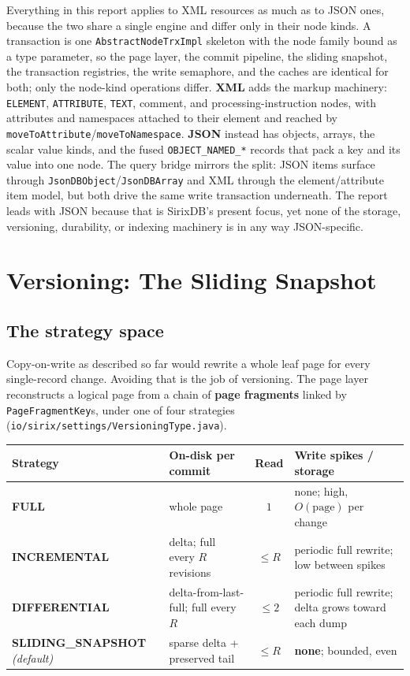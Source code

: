 \documentclass[11pt,a4paper,oneside]{report}
\theoremstyle{sirixthm}
\newcommand{\code}[1]{\texttt{#1}}
\begin{document}
Everything in this report applies to XML resources as much as to JSON ones, because the two share a
single engine and differ only in their node kinds. A transaction is one \code{AbstractNodeTrxImpl}
skeleton with the node family bound as a type parameter, so the page layer, the commit pipeline, the
sliding snapshot, the transaction registries, the write semaphore, and the caches are identical for
both; only the node-kind operations differ. \textbf{XML} adds the markup machinery: \code{ELEMENT},
\code{ATTRIBUTE}, \code{TEXT}, comment, and processing-instruction nodes, with attributes and namespaces
attached to their element and reached by \code{moveToAttribute}/\allowbreak\code{moveToNamespace}.
\textbf{JSON} instead has objects, arrays, the scalar value kinds, and the fused \code{OBJECT\_NAMED\_*}
records that pack a key and its value into one node. The query bridge mirrors the split: JSON items
surface through \code{JsonDBObject}/\allowbreak\code{JsonDBArray} and XML through the element/attribute item
model, but both drive the same write transaction underneath. The report leads with JSON because that is
SirixDB's present focus, yet none of the storage, versioning, durability, or indexing machinery is in
any way JSON-specific.

\chapter{Versioning: The Sliding Snapshot}
\label{ch:versioning}

\section{The strategy space}
\label{sec:strategyspace}

Copy-on-write as described so far would rewrite a whole leaf page for every single-record
change. Avoiding that is the job of versioning. The page layer reconstructs a logical page
from a chain of \textbf{page fragments} linked by \code{PageFragmentKey}s, under one of four
strategies (\code{io/sirix/settings/VersioningType.java}).

\begin{table}[h]
\small\setlength{\tabcolsep}{5pt}
\renewcommand{\arraystretch}{1.25}
\begin{tabularx}{\linewidth}{@{}l X c X@{}}
\toprule
\textbf{Strategy} & \textbf{On-disk per commit} & \textbf{Read} & \textbf{Write spikes / storage}\\
\midrule
\textbf{FULL} & whole page & $1$ & none; high, $O(\text{page})$ per change\\
\textbf{INCREMENTAL} & delta; full every $R$ revisions & $\leq R$ & periodic full rewrite; low between spikes\\
\textbf{DIFFERENTIAL} & delta-from-last-full; full every $R$ & $\leq 2$ & periodic full rewrite; delta grows toward each dump\\
\textbf{SLIDING\_SNAPSHOT} \textit{(default)} & sparse delta {+} preserved tail & $\leq R$ & \textbf{none}; bounded, even\\
\bottomrule
\end{tabularx}
\end{table}
\end{document}
